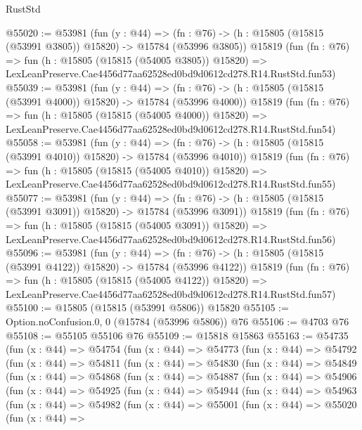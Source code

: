 \begin{lexlean}{RustStd}
\begin{coremodule}
@55020 := @53981
    (fun (y : @44) =>
    (fn : @76) -> (h : @15805 (@15815 (@53991 @3805)) @15820) -> @15784 (@53996 @3805))
    @15819
    (fun (fn : @76) =>
    fun (h : @15805 (@15815 (@54005 @3805)) @15820) =>
    LexLeanPreserve.Cae4456d77aa62528ed0bd9d0612cd278.R14.RustStd.fun53)
@55039 := @53981
    (fun (y : @44) =>
    (fn : @76) -> (h : @15805 (@15815 (@53991 @4000)) @15820) -> @15784 (@53996 @4000))
    @15819
    (fun (fn : @76) =>
    fun (h : @15805 (@15815 (@54005 @4000)) @15820) =>
    LexLeanPreserve.Cae4456d77aa62528ed0bd9d0612cd278.R14.RustStd.fun54)
@55058 := @53981
    (fun (y : @44) =>
    (fn : @76) -> (h : @15805 (@15815 (@53991 @4010)) @15820) -> @15784 (@53996 @4010))
    @15819
    (fun (fn : @76) =>
    fun (h : @15805 (@15815 (@54005 @4010)) @15820) =>
    LexLeanPreserve.Cae4456d77aa62528ed0bd9d0612cd278.R14.RustStd.fun55)
@55077 := @53981
    (fun (y : @44) =>
    (fn : @76) -> (h : @15805 (@15815 (@53991 @3091)) @15820) -> @15784 (@53996 @3091))
    @15819
    (fun (fn : @76) =>
    fun (h : @15805 (@15815 (@54005 @3091)) @15820) =>
    LexLeanPreserve.Cae4456d77aa62528ed0bd9d0612cd278.R14.RustStd.fun56)
@55096 := @53981
    (fun (y : @44) =>
    (fn : @76) -> (h : @15805 (@15815 (@53991 @4122)) @15820) -> @15784 (@53996 @4122))
    @15819
    (fun (fn : @76) =>
    fun (h : @15805 (@15815 (@54005 @4122)) @15820) =>
    LexLeanPreserve.Cae4456d77aa62528ed0bd9d0612cd278.R14.RustStd.fun57)
@55100 := @15805 (@15815 (@53991 @5806)) @15820
@55105 := Option.noConfusion.{0, 0} (@15784 (@53996 @5806)) @76
@55106 := @4703 @76
@55108 := @55105 @55106 @76
@55109 := @15818 @15863
@55163 := @54735
    (fun (x : @44) =>
    @54754
      (fun (x : @44) =>
      @54773
        (fun (x : @44) =>
        @54792
          (fun (x : @44) =>
          @54811
            (fun (x : @44) =>
            @54830
              (fun (x : @44) =>
              @54849
                (fun (x : @44) =>
                @54868
                  (fun (x : @44) =>
                  @54887
                    (fun (x : @44) =>
                    @54906
                      (fun (x : @44) =>
                      @54925
                        (fun (x : @44) =>
                        @54944
                          (fun (x : @44) =>
                          @54963
                            (fun (x : @44) =>
                            @54982
                              (fun (x : @44) =>
                              @55001
                                (fun (x : @44) =>
                                @55020
                                  (fun (x : @44) =>

\end{coremodule}
\end{lexlean}
